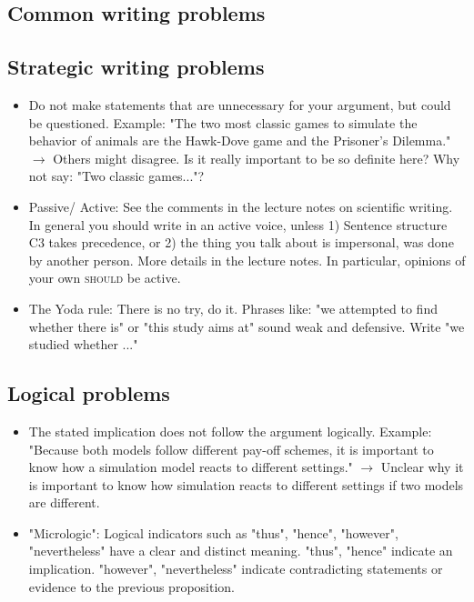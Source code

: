 \documentclass[justified, notoc]{tufte-book} %
\begin{document}
\begin{fullwidth}


	
\makeatletter\@openrightfalse

\begin{appendices}
\section{Common writing problems}
\subsection{Strategic writing problems}
\begin{itemize}
	\item Do not make statements that are unnecessary for your argument, but could be questioned. 
	Example: "The two most classic games to simulate the behavior of animals are the Hawk-Dove game and the Prisoner's Dilemma." $\rightarrow$ Others might disagree. Is it really important to be so definite here? Why not say: "Two classic games..."?
	\item Passive/ Active: See the comments in the lecture notes on scientific writing. In general you should write in an active voice, unless  1) Sentence structure C3 takes precedence, or 2) the thing you talk about is impersonal, was done by another person. More details in the lecture notes. In particular, opinions of your own \textsc{should} be active.
	\item The Yoda rule: There is no try, do it. Phrases like: "we attempted to find whether there is" or "this study aims at" sound weak and defensive. Write "we studied whether ..."
\end{itemize}

\subsection{Logical problems}
\begin{itemize}
	\item The stated implication does not follow the argument logically. Example: "Because both models follow different pay-off schemes, it is important to know how a simulation model reacts to different settings." $\rightarrow$ Unclear why it is important to know how simulation reacts to different settings if two models are different.
	\item "Micrologic": Logical indicators such as "thus", "hence", "however", "nevertheless" have a clear and distinct meaning. "thus", "hence" indicate an implication. "however", "nevertheless" indicate contradicting statements or evidence to the previous proposition.
\end{itemize}


\end{appendices}
\end{fullwidth}
\end{document}
